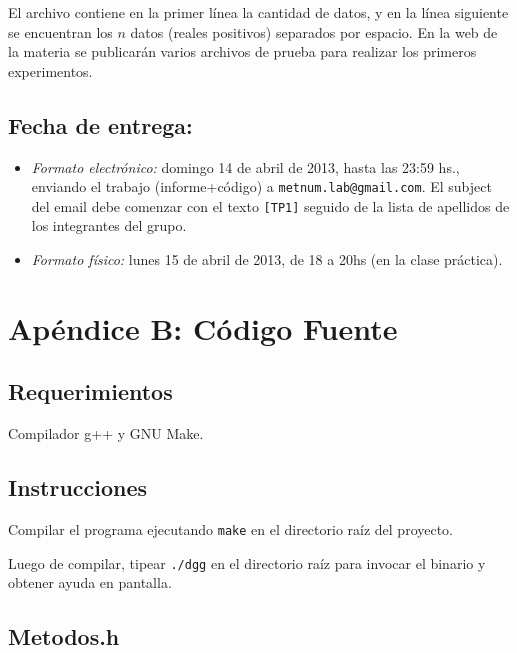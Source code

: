 \documentclass[a4paper,10pt,twoside]{article}
\begin{document}
\vspace{0.5cm}

El archivo contiene en la primer l\'inea la cantidad de datos, y en la l\'inea siguiente se encuentran los $n$ datos (reales positivos) separados por espacio. En la web de la materia se publicar\'an varios archivos de prueba para realizar los primeros experimentos.

\subsection{Fecha de entrega:} 

\begin{itemize}
\item \textsl{Formato electr\'onico:} domingo 14 de abril de 2013, hasta las 23:59 hs., enviando el trabajo (informe+c\'odigo) a \texttt{metnum.lab@gmail.com}. El subject del email debe comenzar con el texto \verb|[TP1]| seguido de la lista de apellidos de los integrantes del grupo. 
\item \textsl{Formato f\'isico:} lunes 15 de abril de 2013, de 18 a 20hs (en la clase pr\'actica).
\end{itemize}




\section{Apéndice B: Código Fuente}


\subsection{Requerimientos}

Compilador g++ y GNU Make.


\subsection{Instrucciones}

Compilar el programa ejecutando \texttt{make} en el directorio raíz del proyecto.

Luego de compilar, tipear \texttt{./dgg} en el directorio raíz para invocar el
binario y obtener ayuda en pantalla.


\subsection{Metodos.h}

\end{document}
